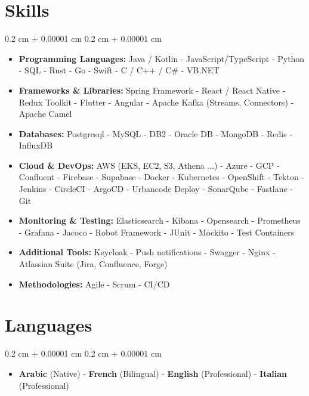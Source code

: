 \documentclass[10pt, a4paper]{article}
\newenvironment{highlightsforbulletentries}{
    \begin{itemize}[
        topsep=0.10 cm,
        parsep=0.10 cm,
        partopsep=0pt,
        itemsep=0pt,
        leftmargin=10pt
    ]
}{
    \end{itemize}
} %
\newenvironment{onecolentry}{
    \begin{adjustwidth}{
        0.2 cm + 0.00001 cm
    }{
        0.2 cm + 0.00001 cm
    }
}{
    \end{adjustwidth}
} %
\begin{document}
    \section{Skills}

    \begin{onecolentry}
        \begin{highlightsforbulletentries}


        \item \textbf{Programming Languages:} Java / Kotlin - JavaScript/TypeScript - Python - SQL - Rust - Go - Swift - C / C++ / C\# - VB.NET

        \item \textbf{Frameworks \& Libraries:} Spring Framework - React / React Native - Redux Toolkit - Flutter - Angular - Apache Kafka (Streams, Connectors) - Apache Camel

        \item \textbf{Databases:} Postgresql - MySQL - DB2 - Oracle DB - MongoDB - Redis - InfluxDB

        \item \textbf{Cloud \& DevOps:} AWS (EKS, EC2, S3, Athena ...) - Azure - GCP - Confluent - Firebase - Supabase - Docker - Kubernetes - OpenShift - Tekton - Jenkins - CircleCI - ArgoCD - Urbancode Deploy - SonarQube - Fastlane - Git

        \item \textbf{Monitoring \& Testing:} Elasticsearch - Kibana - Opensearch - Prometheus - Grafana - Jacoco - Robot Framework - JUnit - Mockito - Test Containers

        \item \textbf{Additional Tools:} Keycloak - Push notifications - Swagger - Nginx - Atlassian Suite (Jira, Confluence, Forge)

        \item \textbf{Methodologies:} Agile - Scrum - CI/CD


        \end{highlightsforbulletentries}
    \end{onecolentry}

    \section{Languages}

    \begin{onecolentry}
        \begin{highlightsforbulletentries}


        \item \textbf{Arabic} (Native) - \textbf{French} (Bilingual) - \textbf{English} (Professional) - \textbf{Italian} (Professional)


        \end{highlightsforbulletentries}
    \end{onecolentry}
\end{document}
